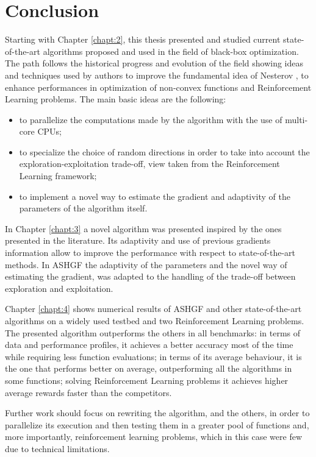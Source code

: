 
\chapter{Conclusion}
\label{conclusion}

Starting with Chapter \ref{chapt:2}, this thesis presented and studied current state-of-the-art algorithms proposed and used in the field of black-box optimization. The path follows the historical progress and evolution of the field showing ideas and techniques used by authors to improve the fundamental idea of Nesterov \cite{nesterov2017random}, to enhance performances in optimization of non-convex functions and Reinforcement Learning problems. The main basic ideas are the following:
\begin{itemize}
	\item to parallelize the computations made by the algorithm with the use of multi-core CPUs;
	\item to specialize the choice of random directions in order to take into account the exploration-exploitation trade-off, view taken from the Reinforcement Learning framework;
	\item to implement a novel way to estimate the gradient and adaptivity of the parameters of the algorithm itself.
\end{itemize}

In Chapter \ref{chapt:3} a novel algorithm was presented inspired by the ones presented in the literature. Its adaptivity and use of previous gradients information allow to improve the performance with respect to state-of-the-art methods. In ASHGF the adaptivity of the parameters and the novel way of estimating the gradient, was adapted to the handling of the trade-off between exploration and exploitation. 

Chapter \ref{chapt:4} shows numerical results of ASHGF and other state-of-the-art algorithms on a widely used testbed and two Reinforcement Learning problems. The presented algorithm outperforms the others in all benchmarks: in terms of data and performance profiles, it achieves a better accuracy most of the time while requiring less function evaluations; in terms of its average behaviour, it is the one that performs better on average, outperforming all the algorithms in some functions; solving Reinforcement Learning problems it achieves higher average rewards faster than the competitors.

Further work should focus on rewriting the algorithm, and the others, in order to parallelize its execution and then testing them in a greater pool of functions and, more importantly, reinforcement learning problems, which in this case were few due to technical limitations.